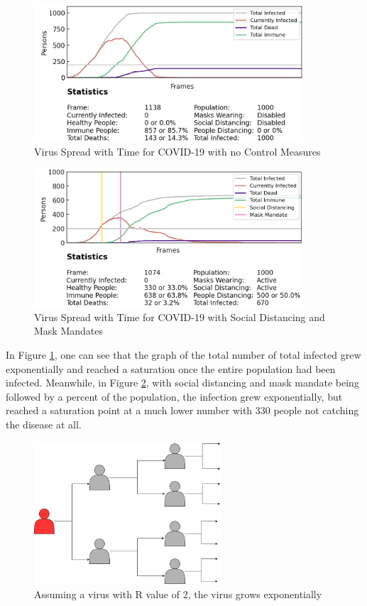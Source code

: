 \documentclass[11pt]{article}
\begin{document}
\begin{figure}[H]
    \centering
    \includegraphics[width=10cm]{figures/covid-nomandates.png}
    \caption{Virus Spread with Time for COVID-19 with no Control Measures}
    \label{covid-exponential-nomandate}
\end{figure}

\begin{figure}[H]
    \centering
    \includegraphics[width=10cm]{figures/covid-propermandates.png}
    \caption{Virus Spread with Time for COVID-19 with Social Distancing and Mask Mandates}
    \label{covid-exponential-mandates}
\end{figure}

In Figure \ref{covid-exponential-nomandate}, one can see that the graph of the total number of total infected grew exponentially and reached a saturation once the entire population had been infected. Meanwhile, in Figure \ref{covid-exponential-mandates}, with social distancing and mask mandate being followed by a percent of the population, the infection grew exponentially, but reached a saturation point at a much lower number with 330 people not catching the disease at all.

\begin{figure}[H]
    \centering
    \includegraphics[width=7cm]{figures/covid-exponential.png}
    \caption{Assuming a virus with R value of 2, the virus grows exponentially}
    \label{covid-exponential}
\end{figure}
\end{document}

